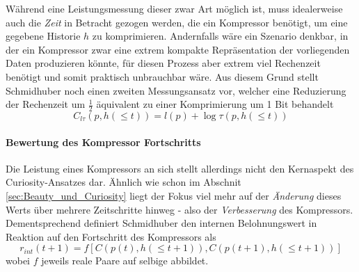 Während eine Leistungsmessung dieser zwar Art möglich ist, muss idealerweise auch die \emph{Zeit} in Betracht gezogen werden, die ein Kompressor benötigt, um eine gegebene Historie \(h\) zu komprimieren. Andernfalls wäre ein Szenario denkbar, in der ein Kompressor zwar eine extrem kompakte Repräsentation der vorliegenden Daten produzieren könnte, für diesen Prozess aber extrem viel Rechenzeit benötigt und somit praktisch unbrauchbar wäre.
Aus diesem Grund stellt Schmidhuber noch einen zweiten Messungsansatz vor, welcher eine Reduzierung der Rechenzeit um \(\frac{1}{2}\) äquivalent zu einer Komprimierung um 1 Bit behandelt \cite[p.~19]{curiosity_schmidhuber}
\begin{equation}
  C_{l\tau}(p,h(\leq t)) = l(p) + \log \tau(p, h(\leq t))
\end{equation}


\paragraph{Bewertung des Kompressor Fortschritts}
Die Leistung eines Kompressors an sich stellt allerdings nicht den Kernaspekt des Curiosity-Ansatzes dar. Ähnlich wie schon im Abschnit \ref{sec:Beauty_und_Curiosity} liegt der Fokus viel mehr auf der \emph{Änderung} dieses Werts über mehrere Zeitschritte hinweg - also der \emph{Verbesserung} des Kompressors.
Dementsprechend definiert Schmidhuber den internen Belohnungswert in Reaktion auf den Fortschritt des Kompressors als 
\begin{equation}
  r_{int}(t+1) = f\left[C(p(t),h(\leq t+1)), C(p(t+1),h(\leq t+1))\right]  
\end{equation}
wobei \(f\) jeweils reale Paare auf selbige abbildet. \cite[p.~19]{curiosity_schmidhuber}






